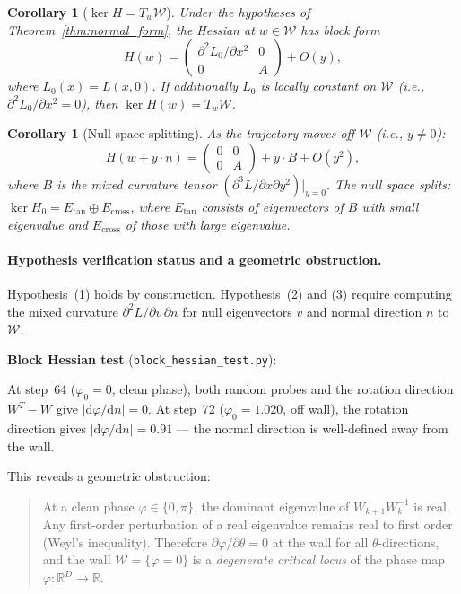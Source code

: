 \documentclass[11pt]{amsart}
\newtheorem{corollary}[theorem]{Corollary}
\begin{document}
\begin{corollary}[$\ker H = T_w \mathcal{W}$]
\label{cor:kernel}
Under the hypotheses of Theorem~\ref{thm:normal_form}, the Hessian
at $w \in \mathcal{W}$ has block form
\[
  H(w) = \begin{pmatrix} \partial^2 L_0/\partial x^2 & 0 \\ 0 & A \end{pmatrix}
  + O(y),
\]
where $L_0(x) = L(x,0)$.
If additionally $L_0$ is locally constant on $\mathcal{W}$
(i.e., $\partial^2 L_0/\partial x^2 = 0$), then
$\ker H(w) = T_w \mathcal{W}$.
\end{corollary}

\begin{corollary}[Null-space splitting]
\label{cor:splitting}
As the trajectory moves off $\mathcal{W}$ (i.e., $y \neq 0$):
\[
  H(w + y\cdot n) = \begin{pmatrix} 0 & 0 \\ 0 & A \end{pmatrix}
  + y \cdot B + O(y^2),
\]
where $B$ is the mixed curvature tensor $(\partial^3 L/\partial x \partial y^2)|_{y=0}$.
The null space splits:
$\ker H_0 = E_\mathrm{tan} \oplus E_\mathrm{cross}$,
where $E_\mathrm{tan}$ consists of eigenvectors of $B$ with small eigenvalue
and $E_\mathrm{cross}$ of those with large eigenvalue.
\end{corollary}

\paragraph{Hypothesis verification status and a geometric obstruction.}

Hypothesis~(1) holds by construction.
Hypothesis~(2) and (3) require computing the mixed curvature
$\partial^2 L/\partial v\,\partial n$ for null eigenvectors $v$
and normal direction $n$ to $\mathcal{W}$.

\textbf{Block Hessian test} (\texttt{block\_hessian\_test.py}):

At step~64 ($\varphi_0 = 0$, clean phase), both random probes and the
rotation direction $W^T - W$ give $|\mathrm{d}\varphi/\mathrm{d}n| = 0$.
At step~72 ($\varphi_0 = 1.020$, off wall), the rotation direction gives
$|\mathrm{d}\varphi/\mathrm{d}n| = 0.91$ --- the normal direction is
well-defined away from the wall.

This reveals a geometric obstruction:
\begin{quote}
At a clean phase $\varphi \in \{0,\pi\}$, the dominant eigenvalue of
$W_{k+1}W_k^{-1}$ is real. Any first-order perturbation of a real
eigenvalue remains real to first order (Weyl's inequality).
Therefore $\partial\varphi/\partial\theta = 0$ at the wall for all
$\theta$-directions, and the wall $\mathcal{W} = \{\varphi = 0\}$
is a \emph{degenerate critical locus} of the phase map
$\varphi: \mathbb{R}^D \to \mathbb{R}$.
\end{quote}
\end{document}
